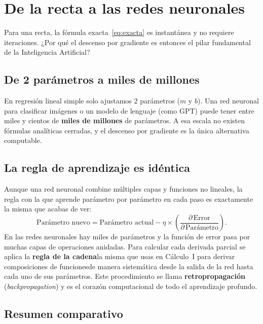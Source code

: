 \documentclass[12pt, a4paper]{article}
\begin{document}
\section{De la recta a las redes neuronales}

Para una recta, la fórmula exacta~\eqref{eq:exacta} es instantánea y no requiere iteraciones. ¿Por qué el descenso por gradiente es entonces el pilar fundamental de la Inteligencia Artificial?

\subsection{De 2 parámetros a miles de millones}

En regresión lineal simple solo ajustamos 2 parámetros ($m$ y $b$). Una red neuronal para clasificar imágenes o un modelo de lenguaje (como GPT) puede tener entre miles y cientos de \textbf{miles de millones} de parámetros. A esa escala no existen fórmulas analíticas cerradas, y el descenso por gradiente es la única alternativa computable.

\subsection{La regla de aprendizaje es idéntica}

Aunque una red neuronal combine múltiples capas y funciones no lineales, la regla con la que aprende parámetro por parámetro en cada paso es exactamente la misma que acabas de ver:
\[
    \text{Parámetro nuevo} = \text{Parámetro actual}
    - \eta \times \left(\frac{\partial\,\text{Error}}{\partial\,\text{Parámetro}}\right).
\]
En las redes neuronales hay miles de parámetros y la función de error pasa por muchas capas de operaciones anidadas. Para calcular cada derivada parcial se aplica la \textbf{regla de la cadena}\textemdash la misma que usas en Cálculo~I para derivar composiciones de funciones\textemdash de manera sistemática desde la salida de la red hasta cada uno de sus parámetros. Este procedimiento se llama \textbf{retropropagación} (\textit{backpropagation}) y es el corazón computacional de todo el aprendizaje profundo.

\subsection{Resumen comparativo}
\end{document}
